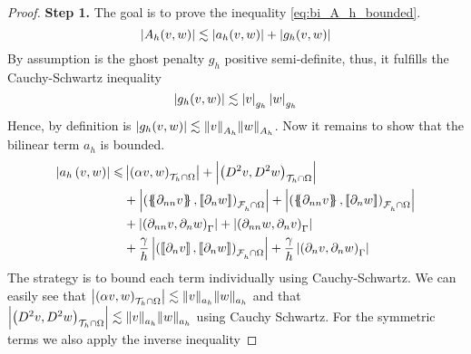 \begin{proof}
         \textbf{Step 1.} The goal is to prove the inequality \eqref{eq:bi_A_h_bounded}. \[
                \left\lvert  A_{h}( v ,w )  \right\rvert \lesssim   \left\lvert a_{h}( v, w)  \right\rvert   + \left\lvert g_{h}( v,w)   \right\rvert          \]
                By assumption is the ghost penalty $g_{h}$ positive semi-definite, thus, it fulfills the Cauchy-Schwartz inequality \[
                \left\lvert  g_{h}(v,w )  \right\rvert \lesssim \left\lvert  v  \right\rvert _{g_{h}}\left\lvert  w  \right\rvert_{g_{h}}
                \]
                Hence, by definition is $\left\lvert  g_{h}(v,w )  \right\rvert \lesssim \| v \|_{ A_{h} }^{  } \| w \|_{ A_{h} }^{  } $. Now it remains to show that the bilinear term $ a_{h}$ is bounded.
                \begin{equation}
                    \begin{split}
                        \abs{ a_{h} \left( v, w \right) }   \le  &   \abs{\left( \alpha  v, w \right) _{\mathcal{T} _{h} \cap \Omega }  }    +  \abs{\left( D^2 v, D^2w \right) _{\mathcal{T} _{h} \cap \Omega}  }  \\
                                                     & + \abs{\left( \mean{  \partial _{n n} v }, \jump{ \partial _{n }w} \right)_{\mathcal{F}_{h}^{} \cap \Omega}  }   +
                                                     \abs{\left( \mean{ \partial _{nn } v }, \jump{ \partial _{n}w }      \right)_{\mathcal{F}_{h}^{} \cap \Omega}  } \\
                                                     & + \abs{\left(  \partial _{n n} v ,  \partial _{n }w \right)_{\Gamma }}     +
                                                     \abs{\left(  \partial _{n n} w ,  \partial _{n}v       \right)_{\Gamma }  }
                                                     \\
                                                     & + \frac{\gamma }{h} \abs{ \left( \jump{ \partial _{n} v}, \jump{ \partial _{n} w   }   \right)_{\mathcal{F}_{h}^{} \cap \Omega}  } + \frac{\gamma }{h} \abs{ \left(  \partial _{n} v,  \partial _{n} w
                                                     \right)_{\Gamma }  }
                    \end{split}
                \end{equation}
                The strategy is to bound each term individually using Cauchy-Schwartz. We can easily see that $\left\lvert \left( \alpha  v, w \right) _{\mathcal{T} _{h} \cap \Omega }   \right\rvert   \lesssim \| v \|_{a_{h}  }^{  } \| w \|_{ a_{h} }^{  } $ and that
                $\left\lvert \left( D^2 v, D^2w \right) _{\mathcal{T} _{h} \cap \Omega}   \right\rvert \lesssim \| v \|_{a_{h}  }^{  } \| w \|_{ a_{h} }^{  } $ using Cauchy Schwartz. For the symmetric terms we also apply the inverse inequality

\end{proof}
